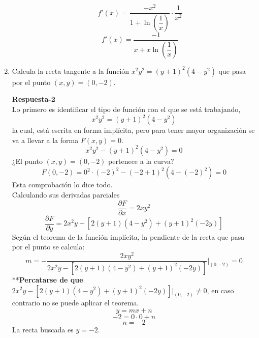 \documentclass[10pt,twoside]{SelfArx} %
\begin{document}
\begin{enumerate}
\begin{enumerate}
	
	\[ f'(x)=\dfrac{-x^{2}}{1+\ln \left (\dfrac{1}{x} \right )}\cdot\dfrac{1}{x^{2}} \]
	\[ f'(x)=\dfrac{-1}{x+x\ln \left (\dfrac{1}{x} \right )} \]
	
	
	
	
\end{enumerate}
	
	\item	Calcula la recta tangente a la funci\'on $ x^{2}y^{2}=(y+1)^{2}(4-y^{2}) $ que pasa por el punto $ (x,y)=(0,-2) $.

\textbf{Respuesta-2}\\

Lo primero es identificar el tipo de función con el que se está trabajando,
\[ x^{2}y^{2}=(y+1)^{2}(4-y^{2}) \]
la cual, está escrita en forma implícita, pero para tener mayor organización se va a llevar a la forma $ F(x,y)=0 $.
\[ x^{2}y^{2}-(y+1)^{2}(4-y^{2})=0 \]
¿El punto $ (x,y)=(0,-2) $ pertenece a la curva?
\[ F(0,-2)=0^{2}\cdot(-2)^{2}-(-2+1)^{2}(4-(-2)^{2})=0 \]
Esta comprobación lo dice todo.\\
Calculando sus derivadas parciales
\[ \dfrac{\partial F}{\partial x}=2xy^{2} \]
\[ \dfrac{\partial F}{\partial y}=2x^{2}y-[2(y+1)(4-y^{2})+(y+1)^{2}(-2y)] \]
Según el teorema de la función implícita, la pendiente de la recta que pasa por el punto se calcula:\\
\[ m=- \dfrac{2xy^{2}}{2x^{2}y-[2(y+1)(4-y^{2})+(y+1)^{2}(-2y)]}\Bigg|_{(0,-2)}=0\]
**\textbf{Percatarse de que}  $ 2x^{2}y-[2(y+1)(4-y^{2})+(y+1)^{2}(-2y)]\Bigg|_{(0,-2)}\neq0 $, en caso contrario no se puede aplicar el teorema.
\[ y=mx+n \]
\[ -2=0\cdot0+n \]
\[ n=-2 \]
La recta buscada es $ y=-2 $.






\end{enumerate}
\end{document}
